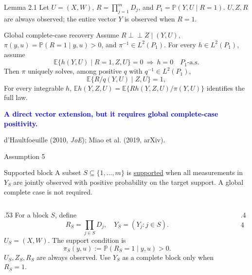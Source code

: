 \documentclass[aspectratio=169,10pt]{beamer}
\newcommand{\slidebody}{\fontsize{10.6pt}{12.6pt}\selectfont}
\renewcommand{\small}{\slidebody}
\renewcommand{\footnotesize}{\slidebody}
\newcommand{\E}{\mathbb E}
\newcommand{\Prb}{\mathbb P}
\newcommand{\indep}{\mathrel{\perp\!\!\!\perp}}
\newcommand{\bluekey}[1]{\textcolor{Blue}{\textbf{#1}}}
\newcommand{\term}[1]{\underline{#1}}
\newenvironment{theorembox}[1]{\begin{block}{#1}}{\end{block}}
\begin{document}
\begin{frame}{Lemma 2.1}
\small
Let $U=(X,W)$, $R=\prod_{j=1}^mD_j$, and $P_1=\Prb(Y,U\mid R=1)$.
$U,Z,R$ are always observed; the entire vector $Y$ is observed when $R=1$.
\begin{theorembox}{Global complete-case recovery}
Assume $R\indep Z\mid(Y,U)$, $\pi(y,u)=\Prb(R=1\mid y,u)>0$, and $\pi^{-1}\in L^2(P_1)$.
For every $h\in L^2(P_1)$, assume
\[
\E\{h(Y,U)\mid R=1,Z,U\}=0\ \Longrightarrow\ h=0\quad P_1\text{-a.s.}
\]
Then $\pi$ uniquely solves, among positive $q$ with $q^{-1}\in L^2(P_1)$,
\[
\E\{R/q(Y,U)\mid Z,U\}=1,
\]
For every integrable $h$, $\E h(Y,Z,U)=\E\{Rh(Y,Z,U)/\pi(Y,U)\}$ identifies the full law.
\end{theorembox}
\bluekey{A direct vector extension, but it requires global complete-case positivity.}
\par{\footnotesize d'Haultfoeuille (2010, \emph{JoE}); Miao et al. (2019, arXiv).}
\end{frame}

\begin{frame}{Assumption 5}
\begin{block}{Supported block}
A subset $S\subseteq\{1,\ldots,m\}$ is \term{supported} when all measurements in $Y_S$ are jointly observed with positive probability on the target support. A global complete case is not required.
\end{block}
\begin{columns}[c,onlytextwidth]
\begin{column}{.53\textwidth}
For a block $S$, define
\[
R_S=\prod_{j\in S}D_j,\quad Y_S=(Y_j:j\in S).
\]
$U_S=(X,W)$. The support condition is
\[
\pi_S(y,u):=\Prb(R_S=1\mid y,u)>0.
\]
$U_S,Z_S,R_S$ are always observed. Use $Y_S$ as a complete block only when $R_S=1$.
\end{column}
\begin{column}{.44\textwidth}
\centering

\end{column}
\end{columns}
\end{frame}
\end{document}
